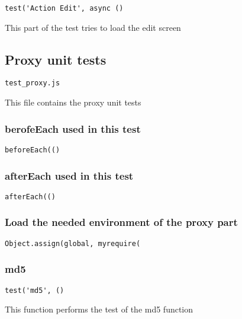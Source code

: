 \documentclass[a4paper]{article}
\begin{document}
\begin{lstlisting}
test('Action Edit', async ()
\end{lstlisting}

This part of the test tries to load the edit screen

\hypertarget{toc234}{}
\subsection{Proxy unit tests}

\begin{lstlisting}
test_proxy.js
\end{lstlisting}

This file contains the proxy unit tests

\hypertarget{toc235}{}
\subsubsection{berofeEach used in this test}

\begin{lstlisting}
beforeEach(()
\end{lstlisting}

\hypertarget{toc236}{}
\subsubsection{afterEach used in this test}

\begin{lstlisting}
afterEach(()
\end{lstlisting}

\hypertarget{toc237}{}
\subsubsection{Load the needed environment of the proxy part}

\begin{lstlisting}
Object.assign(global, myrequire(
\end{lstlisting}

\hypertarget{toc238}{}
\subsubsection{md5}

\begin{lstlisting}
test('md5', ()
\end{lstlisting}

This function performs the test of the md5 function
\end{document}
